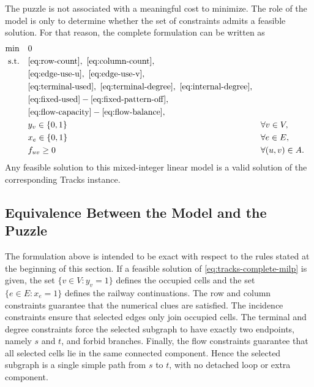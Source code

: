 The puzzle is not associated with a meaningful cost to minimize. The role of the model is only to determine whether the set of constraints admits a feasible solution. For that reason, the complete formulation can be written as
\begin{subequations}
\label{eq:tracks-complete-milp}
\begin{align}
    \min \quad & 0 \label{eq:tracks-complete-objective}\\
    \text{s.t.} \quad
    & \eqref{eq:row-count},\ \eqref{eq:column-count}, \notag\\
    & \eqref{eq:edge-use-u},\ \eqref{eq:edge-use-v}, \notag\\
    & \eqref{eq:terminal-used},\ \eqref{eq:terminal-degree},\
      \eqref{eq:internal-degree}, \notag\\
    & \eqref{eq:fixed-used}-\eqref{eq:fixed-pattern-off}, \notag\\
    & \eqref{eq:flow-capacity}-\eqref{eq:flow-balance}, \notag\\
    & y_v \in \{0,1\} && \forall v \in V, \label{eq:tracks-complete-y}\\
    & x_e \in \{0,1\} && \forall e \in E, \label{eq:tracks-complete-x}\\
    & f_{uv} \geq 0 && \forall (u,v) \in A.
    \label{eq:tracks-complete-f}
\end{align}
\end{subequations}
Any feasible solution to this mixed-integer linear model is a valid solution of the corresponding Tracks instance.

\subsection{Equivalence Between the Model and the Puzzle}

The formulation above is intended to be exact with respect to the rules stated
at the beginning of this section. If a feasible solution of
\eqref{eq:tracks-complete-milp} is given, the set
\(\{v \in V : y_v=1\}\) defines the occupied cells and the set
\(\{e \in E : x_e=1\}\) defines the railway continuations. The row and column
constraints guarantee that the numerical clues are satisfied. The incidence
constraints ensure that selected edges only join occupied cells. The terminal
and degree constraints force the selected subgraph to have exactly two
endpoints, namely \(s\) and \(t\), and forbid branches. Finally, the flow
constraints guarantee that all selected cells lie in the same connected
component. Hence the selected subgraph is a single simple path from \(s\) to
\(t\), with no detached loop or extra component.

